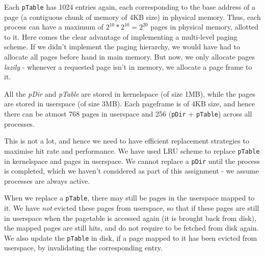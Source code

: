 \documentclass[12pt,a4paper,english]{paper}
\begin{document}
Each \texttt{pTable} has 1024 entries again, each corresponding to the base address of a page (a contiguous chunk of memory of 4KB size) in physical memory. Thus, each process can have a maximum of $2^{10}*2^{10}=2^{20}$ pages in physical memory, allotted to it. Here comes the clear advantage of implementing a multi-level paging scheme. If we didn't implement the paging hierarchy, we would have had to allocate all pages before hand in main memory. But now, we only allocate pages \textit{lazily} - whenever a requested page isn't in memory, we allocate a page frame to it.

All the \textit{pDir} and \textit{pTable} are stored in kernelspace (of size 1MB), while the pages are stored in userspace (of size 3MB). Each pageframe is of 4KB size, and hence there can be atmost 768 pages in userspace and 256 (\texttt{pDir} + \texttt{pTable}) across all processes.

This is not a lot, and hence we need to have efficient replacement strategies to maximise hit rate and performance. We have used LRU scheme to replace \texttt{pTable} in kernelspace and pages in userspace. We cannot replace a \texttt{pDir} until the process is completed, which we haven't considered as part of this assignment - we assume processes are always active.

When we replace a \texttt{pTable}, there may still be pages in the userspace mapped to it. We have \textit{not} evicted these pages from userspace, so that if these pages are still in userspace when the pagetable is accessed again (it is brought back from disk), the mapped pages are still hits, and do not require to be fetched from disk again. We also update the \texttt{pTable} in disk, if a page mapped to it has been evicted from userspace, by invalidating the corresponding entry.
\end{document}
